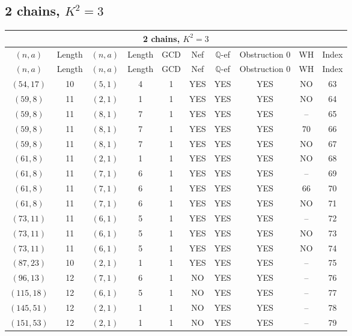 \subsection{2 chains, $K^2 = 3$}
\begin{longtable}{|c|c|c|c|c|c|c|c|c|c|}
\hline
\multicolumn{10}{|c|}{2 chains, $K^2 = 3$}\\
\hline
$(n,a)$ & Length & $(n,a)$ & Length & GCD & Nef & $\mathbb Q$-ef & Obstruction 0 & WH & Index\\
\hline
\endfirsthead

\hline
$(n,a)$ & Length & $(n,a)$ & Length & GCD & Nef & $\mathbb Q$-ef & Obstruction 0 & WH & Index\\
\hline
\endhead
\hline
\endfoot

$(54, 17)$ & 10 & $(5, 1)$ & 4 & 1 & YES & YES & YES & NO & 63\\
$(59, 8)$ & 11 & $(2, 1)$ & 1 & 1 & YES & YES & YES & NO & 64\\
$(59, 8)$ & 11 & $(8, 1)$ & 7 & 1 & YES & YES & YES & -- & 65\\
$(59, 8)$ & 11 & $(8, 1)$ & 7 & 1 & YES & YES & YES & 70 & 66\\
$(59, 8)$ & 11 & $(8, 1)$ & 7 & 1 & YES & YES & YES & NO & 67\\
$(61, 8)$ & 11 & $(2, 1)$ & 1 & 1 & YES & YES & YES & NO & 68\\
$(61, 8)$ & 11 & $(7, 1)$ & 6 & 1 & YES & YES & YES & -- & 69\\
$(61, 8)$ & 11 & $(7, 1)$ & 6 & 1 & YES & YES & YES & 66 & 70\\
$(61, 8)$ & 11 & $(7, 1)$ & 6 & 1 & YES & YES & YES & NO & 71\\
$(73, 11)$ & 11 & $(6, 1)$ & 5 & 1 & YES & YES & YES & -- & 72\\
$(73, 11)$ & 11 & $(6, 1)$ & 5 & 1 & YES & YES & YES & NO & 73\\
$(73, 11)$ & 11 & $(6, 1)$ & 5 & 1 & YES & YES & YES & NO & 74\\
$(87, 23)$ & 10 & $(2, 1)$ & 1 & 1 & YES & YES & YES & -- & 75\\
$(96, 13)$ & 12 & $(7, 1)$ & 6 & 1 & NO & YES & YES & -- & 76\\
$(115, 18)$ & 12 & $(6, 1)$ & 5 & 1 & NO & YES & YES & -- & 77\\
$(145, 51)$ & 12 & $(2, 1)$ & 1 & 1 & NO & YES & YES & -- & 78\\
$(151, 53)$ & 12 & $(2, 1)$ & 1 & 1 & NO & YES & YES & -- & 79
\end{longtable}
